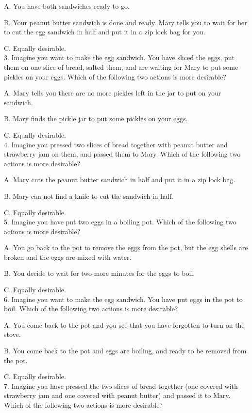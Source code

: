 \documentclass[12pt]{report}
\begin{document}
\begin{appendices}
A. You have both sandwiches ready to go.

B. Your peanut butter sandwich is done and ready. Mary tells you to wait for her to cut the egg sandwich in half and put it in a zip lock bag for you.

C. Equally desirable.\\


3. Imagine you want to make the egg sandwich. You have sliced the eggs, put them on one slice of bread, salted them, and are waiting for Mary to put some pickles on your eggs. Which of the following two actions is more desirable?

A. Mary tells you there are no more pickles left in the jar to put on your sandwich.

B. Mary finds the pickle jar to put some pickles on your eggs.

C. Equally desirable.\\


4. Imagine you pressed two slices of bread together with peanut butter and strawberry jam on them, and passed them to Mary. Which of the following two actions is more desirable?

A. Mary cuts the peanut butter sandwich in half and put it in a zip lock bag.

B. Mary can not find a knife to cut the sandwich in half.

C. Equally desirable.\\


5. Imagine you have put two eggs in a boiling pot. Which of the following two actions is more desirable?

A. You go back to the pot to remove the eggs from the pot, but the egg shells are broken and the eggs are mixed with water.

B. You decide to wait for two more minutes for the eggs to boil.

C. Equally desirable.\\


6. Imagine you want to make the egg sandwich. You have put eggs in the pot to boil. Which of the following two actions is more desirable?

A. You come back to the pot and you see that you have forgotten to turn on the stove.

B. You come back to the pot and eggs are boiling, and ready to be removed from the pot.

C. Equally desirable.\\


7. Imagine you have pressed the two slices of bread together (one covered with strawberry jam and one covered with peanut butter) and passed it to Mary. Which of the following two actions is more desirable?


\end{appendices}
\end{document}
